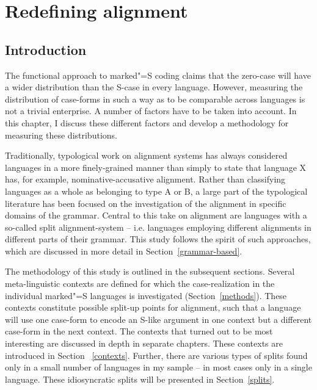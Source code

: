 \chapter{Redefining alignment}\label{method}

\section{Introduction}
The functional approach to marked"=S coding \citep{Koenig:2006,Koenig:2008} claims that the zero-case will have a wider distribution than the S-case in every language. 
However, measuring the distribution of case-forms in such a way as to be comparable across languages is not a trivial enterprise. 
A number of factors have to be taken into account. 
In this chapter, I discuss these different factors and develop a methodology for measuring these distributions.  

Traditionally, typological work on alignment systems has always considered languages in a more finely-grained manner than simply to state that language X has, for example, no\-mi\-na\-tive-accusative alignment. 
Rather than classifying languages as a whole as belonging to type A or B, a large part of the typological literature has been focused on the investigation of the alignment in specific domains of the grammar. 
Central to this take on alignment are languages with a so-called split alignment-system -- i.e. languages employing different alignments in different parts of their grammar. 
This study follows the spirit of such approaches, which are discussed in more detail in Section~\ref{grammar-based}. 

The methodology of this study is outlined in the subsequent sections. 
Several meta-linguistic contexts are defined for which the case-realization in the individual marked"=S languages %
is investigated (Section~\ref{methods}). 
These contexts constitute possible split-up points for alignment, such that a language will use one case-form to encode an S-like argument in one context but a different case-form in the next context.
The contexts that turned out to be most interesting are discussed in depth in separate chapters. 
These contexts are introduced in Section ~\ref{contexts}. Further, there are various types of splits found only in a small number of languages in my sample -- in most cases only in a single language. These idiosyncratic splits will be presented in Section~\ref{splits}.

